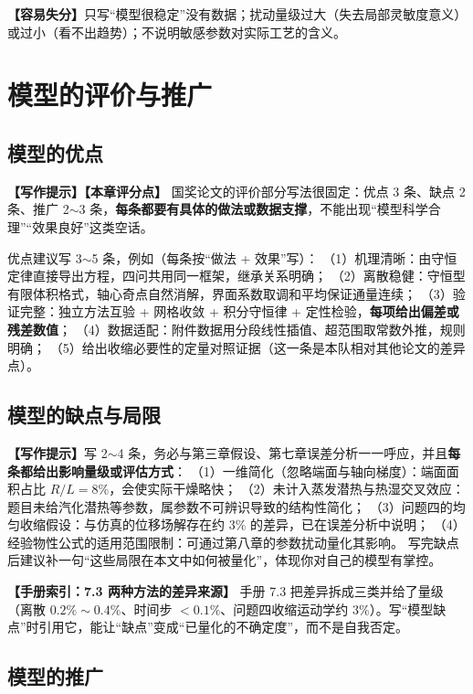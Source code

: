 \documentclass[12pt,a4paper]{article}
\newcommand{\prompt}[1]{\par\noindent\textbf{【写作提示】}#1\par}      %
\newcommand{\pitfall}[1]{\par\noindent\textbf{【容易失分】}#1\par}     %
\newcommand{\handbook}[2]{\par\noindent\textbf{【手册索引：#1】} #2\par}
\begin{document}
\pitfall{只写“模型很稳定”没有数据；扰动量级过大（失去局部灵敏度意义）或过小（看不出趋势）；不说明敏感参数对实际工艺的含义。}

\clearpage

\section{模型的评价与推广}

\subsection{模型的优点}

\prompt{\textbf{【本章评分点】} 国奖论文的评价部分写法很固定：优点 3 条、缺点 2 条、推广 2$\sim$3 条，\textbf{每条都要有具体的做法或数据支撑}，不能出现“模型科学合理”“效果良好”这类空话。

优点建议写 3$\sim$5 条，例如（每条按“做法 + 效果”写）：
（1）机理清晰：由守恒定律直接导出方程，四问共用同一框架，继承关系明确；
（2）离散稳健：守恒型有限体积格式，轴心奇点自然消解，界面系数取调和平均保证通量连续；
（3）验证完整：独立方法互验 + 网格收敛 + 积分守恒律 + 定性检验，\textbf{每项给出偏差或残差数值}；
（4）数据适配：附件数据用分段线性插值、超范围取常数外推，规则明确；
（5）给出收缩必要性的定量对照证据（这一条是本队相对其他论文的差异点）。}

\subsection{模型的缺点与局限}

\prompt{写 2$\sim$4 条，务必与第三章假设、第七章误差分析一一呼应，并且\textbf{每条都给出影响量级或评估方式}：
（1）一维简化（忽略端面与轴向梯度）：端面面积占比 $R/L=8\%$，会使实际干燥略快；
（2）未计入蒸发潜热与热湿交叉效应：题目未给汽化潜热等参数，属参数不可辨识导致的结构性简化；
（3）问题四的均匀收缩假设：与仿真的位移场解存在约 $3\%$ 的差异，已在误差分析中说明；
（4）经验物性公式的适用范围限制：可通过第八章的参数扰动量化其影响。
写完缺点后建议补一句“这些局限在本文中如何被量化”，体现你对自己的模型有掌控。}

\handbook{7.3 两种方法的差异来源}{手册 7.3 把差异拆成三类并给了量级（离散 $0.2\%\sim0.4\%$、时间步 $<0.1\%$、问题四收缩运动学约 $3\%$）。写“模型缺点”时引用它，能让“缺点”变成“已量化的不确定度”，而不是自我否定。}

\subsection{模型的推广}
\end{document}

